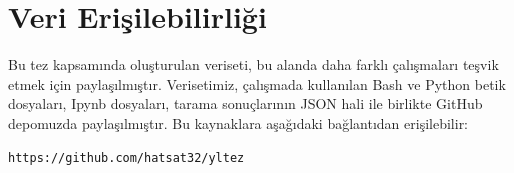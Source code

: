 \chapter{Veri Erişilebilirliği}\label{sec:data-availability}

Bu tez kapsamında oluşturulan veriseti, bu alanda daha farklı çalışmaları teşvik etmek için paylaşılmıştır. Verisetimiz, çalışmada kullanılan Bash ve Python betik dosyaları, Ipynb dosyaları, tarama sonuçlarının JSON hali ile birlikte GitHub depomuzda paylaşılmıştır. Bu kaynaklara aşağıdaki bağlantıdan erişilebilir:

\begin{lstlisting}
https://github.com/hatsat32/yltez
\end{lstlisting}

